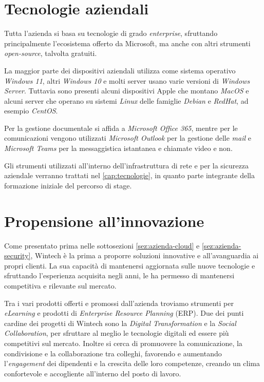 \section{Tecnologie aziendali}
Tutta l'azienda si basa su tecnologie di grado \emph{enterprise}, sfruttando principalmente l'ecosistema offerto da Microsoft, ma anche con altri strumenti \emph{open-source}, talvolta gratuiti.

La maggior parte dei dispositivi aziendali utilizza come sistema operativo \emph{Windows 11}, altri \emph{Windows 10} e molti server usano varie versioni di \emph{Windows Server}. Tuttavia sono presenti alcuni dispositivi Apple che montano \emph{MacOS} e alcuni server che operano su sistemi \emph{Linux} delle famiglie \emph{Debian} e \emph{RedHat}, ad esempio \emph{CentOS}.

Per la gestione documentale si affida a \emph{Microsoft Office 365}, mentre per le comunicazioni vengono utilizzati \emph{Microsoft Outlook} per la gestione delle \emph{mail} e \emph{Microsoft Teams} per la messaggistica istantanea e chiamate video e non.

Gli strumenti utilizzati all'interno dell'infrastruttura di rete e per la sicurezza aziendale verranno trattati nel \autoref{cap:tecnologie}, in quanto parte integrante della formazione iniziale del percorso di stage.

\section{Propensione all'innovazione}

Come presentato prima nelle sottosezioni \ref{sez:azienda-cloud} e \ref{sez:azienda-security}, Wintech è la prima a proporre soluzioni innovative e all'avanguardia ai propri clienti. La sua capacità di mantenersi aggiornata sulle nuove tecnologie e sfruttando l'esperienza acquisita negli anni, le ha permesso di mantenersi competitiva e rilevante sul mercato.

Tra i vari prodotti offerti e promossi dall'azienda troviamo strumenti per \emph{eLearning}\cite{site:wtc-elearning} e prodotti di \emph{Enterprise Resource Planning} (ERP)\cite{site:wtc-erp}. Due dei punti cardine dei progetti di Wintech sono la \emph{Digital Transformation}\cite{site:wtc-digital} e la \emph{Social Collaboration}\cite{site:wtc-collab}, per sfruttare al meglio le tecnologie digitali ed essere più competitivi sul mercato. Inoltre si cerca di promuovere la comunicazione, la condivisione e la collaborazione tra colleghi, favorendo e aumentando l'\emph{engagement} dei dipendenti e la crescita delle loro competenze, creando un clima confortevole e accogliente all'interno del posto di lavoro.

